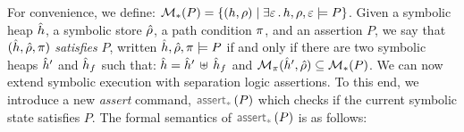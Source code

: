 For convenience, we define: {\small $\mathcal{M}_{*}(P) = \left\{ (h, \rho) \mid \exists \varepsilon \, . \,  h, \rho, \varepsilon \models P  \right\}$}. 
Given a symbolic heap $\hat{h}$, a symbolic store $\hat\rho$, a path condition $\pi$, and 
an assertion $P$, we say that  $(\hat{h}, \hat\rho, \pi)$ \emph{satisfies} $P$, 
written $\hat{h}, \hat\rho, \pi \models P$ if and only if there are two symbolic heaps 
$\hat{h}'$ and $\hat{h}_f$ such that: $\hat{h} = \hat{h}' \, \uplus \, \hat{h}_f$ and 
$\mathcal{M}_{\pi}(\hat{h}', \hat\rho) \subseteq \mathcal{M}_{*}(P)$. 
%
We can now extend \jsil symbolic execution with separation logic assertions. 
To this end, we introduce a new \emph{assert} command, $\sepassert(P)$ which checks
if the current symbolic state satisfies $P$. 
The formal semantics of $\sepassert(P)$ is as follows: 
{\small {}}




